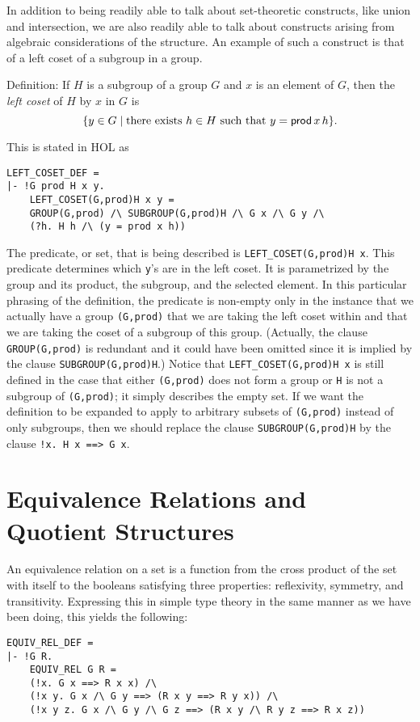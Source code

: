 In addition to being readily able to talk about set-theoretic
constructs, like union and intersection, we are also readily able to
talk about constructs arising from algebraic considerations of the
structure.  An example of such a construct is that of a left coset
of a subgroup in a group.
\begin{display}{Definition:}
If $H$ is a subgroup of a group $G$ and $x$ is an element
of $G$, then the {\it left coset\/} of $H$ by $x$ in $G$ is
$$\{y\in G\mid\mbox{there exists $h\in H$ such that $y={\sf prod}\,x\,h$}\}.$$
\end{display}
This is stated in HOL as
\begin{verbatim}
LEFT_COSET_DEF = 
|- !G prod H x y.
    LEFT_COSET(G,prod)H x y = 
    GROUP(G,prod) /\ SUBGROUP(G,prod)H /\ G x /\ G y /\
    (?h. H h /\ (y = prod x h))
\end{verbatim}

The predicate, or set, that is being described is
{\tt LEFT\_COSET(G,prod)H x}. This predicate determines which
{\tt y}'s are in
the left coset.  It is parametrized by the group and its
product, the subgroup, and the selected element.  In this particular
phrasing of the definition, the predicate is non-empty only in the
instance that we actually have a group {\tt (G,prod)} that we are
taking the left coset within and that we are taking the coset of a
subgroup of this group.  (Actually, the clause {\tt GROUP(G,prod)} is
redundant and it could have been omitted since it is implied by the
clause {\tt SUBGROUP(G,prod)H}.)  Notice that {\tt LEFT\_COSET(G,prod)H x}
is still defined in the case that either {\tt (G,prod)} does not form
a group or {\tt H} is not a subgroup of {\tt (G,prod)}; it simply
describes the empty set.  If we want the definition to be expanded to
apply to arbitrary subsets of {\tt (G,prod)} instead of only subgroups,
then we should replace the clause {\tt SUBGROUP(G,prod)H} by the
clause {\tt !x.~H x ==> G x}.

\section{Equivalence Relations and Quotient Structures}

An equivalence relation on a set is a function from the cross product
of the set with itself to the booleans satisfying three properties:
reflexivity, symmetry, and transitivity.  Expressing this in simple
type theory in the same manner as we have been doing, this yields the
following:
\begin{verbatim}
EQUIV_REL_DEF =
|- !G R.
    EQUIV_REL G R =
    (!x. G x ==> R x x) /\
    (!x y. G x /\ G y ==> (R x y ==> R y x)) /\
    (!x y z. G x /\ G y /\ G z ==> (R x y /\ R y z ==> R x z))
\end{verbatim}

